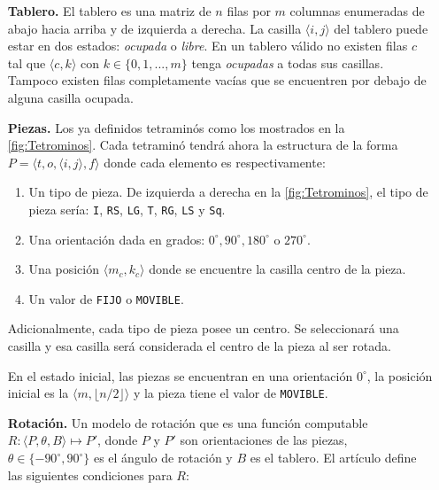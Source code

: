 \begin{itemize}[leftmargin=0.8cm,align=left]
\item[\textbf{Tablero. }] El tablero es una matriz de $n$ filas por $m$ columnas
enumeradas de abajo hacia arriba y de izquierda a derecha. La casilla
$\langle i, j \rangle$ del tablero puede estar en dos estados: \textit{ocupada} o
\textit{libre}. En un tablero válido no existen filas $c$ tal que
$\langle c,k \rangle$ con $k\in \{0,1,...,m\}$ tenga
\textit{ocupadas} a todas sus casillas. Tampoco existen filas completamente vacías que se
encuentren por debajo de alguna casilla ocupada.

\item[\textbf{Piezas. }] Los ya definidos tetraminós como los mostrados en
la \cref{fig:Tetrominos}. Cada tetraminó tendrá ahora la estructura de la
forma $P = \langle t, o, \langle i,j \rangle, f \rangle$ donde cada elemento es
respectivamente:

\begin{enumerate}
        \item Un tipo de pieza. De izquierda a derecha en la  
        \cref{fig:Tetrominos}, el tipo de pieza sería:
        \texttt{I}, \texttt{RS}, \texttt{LG}, \texttt{T},
        \texttt{RG}, \texttt{LS} y \texttt{Sq}.

        \item Una orientación dada en grados: $0^{\circ}, 90^{\circ}, 180^{\circ}$ o $270^{\circ}$.

        \item Una posición $\langle m_{c},k_{c} \rangle$ donde se encuentre la casilla
        centro de la pieza.

        \item Un valor de \texttt{FIJO} o \texttt{MOVIBLE}.
\end{enumerate}

Adicionalmente, cada tipo de pieza posee un centro. Se seleccionará una
casilla y esa casilla será considerada el centro de la pieza al ser rotada.

En el estado inicial, las piezas se encuentran en una orientación $0^{\circ}$,
la posición inicial es la $\langle m ,\lfloor n/2 \rfloor \rangle$ y la pieza tiene
el valor de \texttt{MOVIBLE}.

\item[\textbf{Rotación. }] Un modelo de rotación que es una función computable
$R: \langle P, \theta, B \rangle \mapsto P'$, donde $P$ y $P'$ son orientaciones
de las piezas, $\theta \in \{-90^{\circ}, 90^{\circ}\}$ es el ángulo de
rotación y $B$ es el tablero. El artículo define las siguientes
condiciones para $R$:


\end{itemize}
